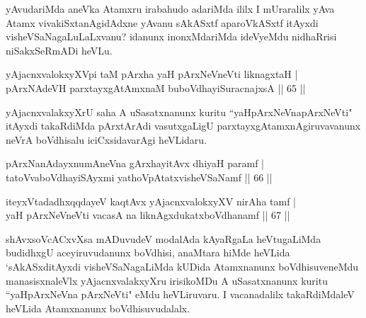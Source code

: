 \begin{artha}%
yAvudariMda aneVka Atamxru irabahudo adariMda ililx I mUraralilx yAva Atamx vivakiSxtanAgidAdxne yAvanu sAkASxtf aparoVkASxtf itAyxdi visheVSaNagaLuLaLxvanu? idanunx inonxMdariMda ideVyeMdu nidhaRrisi niSakxSeRmADi heVLu.
\end{artha}

\begin{shl}
yAjacnxvalokxyXV\s pi taM pArxha yaH pArxNeVneVti liknagxtaH |\\
pArxNAdeVH parxtayxgAtAmxnaM buboVdhayiSuracnajxsA \hfill || 65 ||
\end{shl}

\begin{artha}
yAjacnxvalakxyXrU saha A uSasatxnanunx kuritu ``yaHpArxNeVna\break pArxNeVti" itAyxdi takaRdiMda pArxtArAdi vasutxgaLigU parxtayxgAtamxnAgiruvavanunx neVrA boVdhisalu iciCxsidavarAgi heVLidaru.
\end{artha}



\begin{shl}
pArxNanAdayxnumAneVna gArxhayitAvx dhiyaH paramf |\\
tatoV\s vaboVdhayiSAyxmi yathoVpAtatxvisheVSaNamf \hfill || 66 ||
\end{shl}

\begin{shl}
iteyxVtadadhxqqdayeV kaqtAvx yAjacnxvalokxyXV nirAha tamf |\\
yaH pArxNeVneVti vacasA na liknAgxdukatxboVdhanamf \hfill || 67 ||
\end{shl}

\begin{artha}
shAvxsoVcACxvXsa mADuvudeV modalAda kAyaRgaLa heVtugaLiMda budidhxgU aceyiruvudanunx boVdhisi, anaMtara hiMde heVLida `sAkASxditAyxdi visheVSaNagaLiMda kUDida Atamxnanunx boVdhisuveneMdu manasisxnaleVlx yAjacnxvalakxyXru irisikoMDu A uSasatxnanunx kuritu ``yaHpArxNeVna pArxNeVti" eMdu heVLiruvaru. I vacanadalilx takaRdiMdaleV heVLida Atamxnanunx boVdhisuvudalalx.
\end{artha}%

